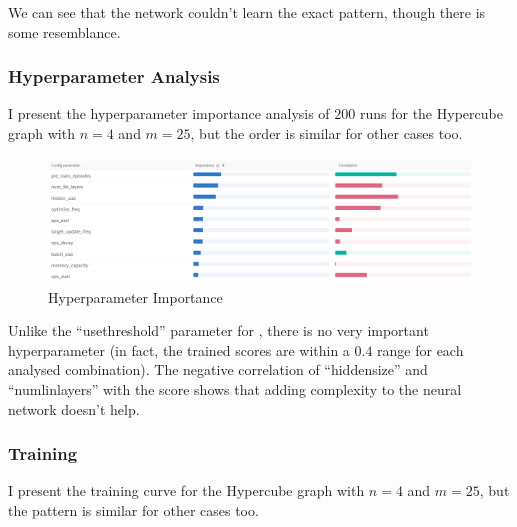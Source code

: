 We can see that the network couldn't learn the exact pattern, though there is some resemblance.


\subsubsection{Hyperparameter Analysis}

I present the hyperparameter importance analysis of $200$ runs for the Hypercube graph with $n=4$ and $m=25$, but the order is similar for other cases too.

\begin{figure}[hbt!] \label{graphical-two-choice-hyperparameter-importance}
    \centering
    \includegraphics[scale=0.4]{Chapter4/Figs/graphical_two_choice_hypercube_4_25_importance.png}
    \caption{\GraphicalTwoChoice Hyperparameter Importance}
\end{figure}


Unlike the ``use\textunderscore threshold'' parameter for \TwoThinning, there is no very important hyperparameter (in fact, the trained scores are within a $0.4$ range for each analysed combination). The negative correlation of ``hidden\textunderscore size'' and ``num\textunderscore lin\textunderscore layers'' with the score shows that adding complexity to the neural network doesn't help.


\subsubsection{Training}

I present the training curve for the Hypercube graph with $n=4$ and $m=25$, but the pattern is similar for other cases too.


